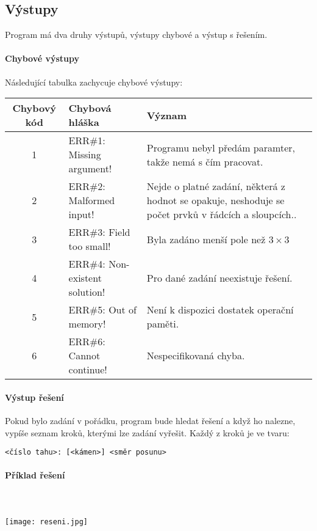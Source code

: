 \documentclass[12pt,titlepage]{article}
\begin{document}
\subsection{Výstupy}
Program má dva druhy výstupů, výstupy chybové a výstup s řešením.
\paragraph{Chybové výstupy}
Následující tabulka zachycuje chybové výstupy:

\begin{center}
\begin{tabular}{|c|l|p{6cm}|}
\hline
Chybový kód & Chybová hláška & Význam\\
\hline
\hline
1 & ERR\#1: Missing argument! & Programu nebyl předám paramter, takže nemá s čím pracovat. \\
\hline
2 & ERR\#2: Malformed input! & Nejde o platné zadání, některá z hodnot se opakuje, neshoduje se počet prvků v řádcích  a sloupcích..\\
\hline
3 & ERR\#3: Field too small! & Byla zadáno menší pole než $3 \times 3$ \\
\hline
4 & ERR\#4: Non-existent solution! & Pro dané zadání neexistuje řešení. \\
\hline
5 & ERR\#5: Out of memory! & Není k dispozici dostatek operační paměti. \\
\hline
6 & ERR\#6: Cannot continue! & Nespecifikovaná chyba. \\
\hline
\end{tabular}
\end{center}

\paragraph{Výstup řešení}
Pokud bylo zadání v pořádku, program bude hledat řešení a když ho nalezne, vypíše seznam kroků, kterými lze zadání vyřešit. Každý z kroků je ve tvaru:
\begin{verbatim}
<číslo tahu>: [<kámen>] <směr posunu>
\end{verbatim}

\paragraph{Příklad řešení}\mbox{}\\\\
\texttt{[image: reseni.jpg]}
\end{document}
